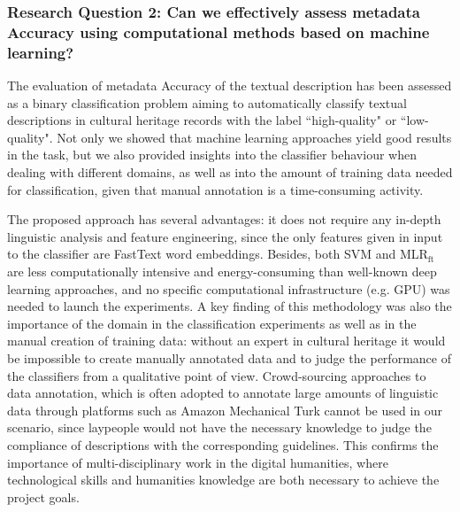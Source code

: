 \documentclass[epsfig,a4paper,12pt,titlepage]{book}
\newcommand{\mlr}{MLR$_\text{ft}$\xspace}
\begin{document}
\subsubsection{\textbf{Research Question 2:} Can we effectively assess metadata Accuracy using computational methods based on machine learning?}

The evaluation of metadata Accuracy of the textual description has been assessed as a binary classification problem aiming to automatically classify textual descriptions in cultural heritage records with the label ``high-quality" or ``low-quality". Not only we showed that machine learning approaches yield good results in the task, but we also provided insights into the classifier behaviour when dealing with different domains, as well as into the amount of training data needed for classification, given that manual annotation is a time-consuming activity.   

The proposed approach has several advantages: it does not require any in-depth linguistic analysis and feature engineering, since the only features given in input to the classifier are FastText word embeddings. Besides, both SVM and \mlr are less computationally intensive and energy-consuming than well-known deep learning approaches, and no specific computational infrastructure (e.g. GPU) was needed to launch the experiments. A key finding of this methodology was also the importance of the domain in the classification experiments as well as in the manual creation of training data: without an expert in cultural heritage it would be impossible to create manually annotated data and to judge the performance of the classifiers from a qualitative point of view. Crowd-sourcing approaches to data annotation, which is often adopted to annotate large amounts of linguistic data through platforms such as Amazon Mechanical Turk cannot be used in our scenario, since laypeople would not have the necessary knowledge to judge the compliance of descriptions with the corresponding guidelines. 
This confirms the importance of multi-disciplinary work in the digital humanities, where technological skills and humanities knowledge are both necessary to achieve the project goals.
\end{document}
